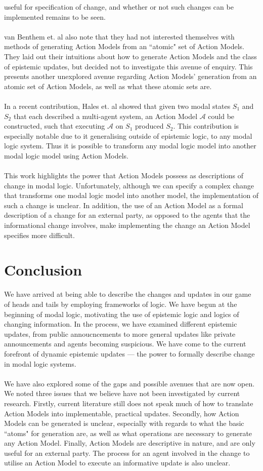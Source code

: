 \documentclass[12pt, a4paper, twoside]{article}
\begin{document}
useful for specification of change, and whether or not such changes can be
implemented remains to be seen.\\
\\
van Benthem et. al also note that they had not interested themselves with methods of
generating Action Models from an ``atomic" set of Action Models.
They laid out their intuitions about how to generate Action Models and the class
of epistemic updates, but decided not to investigate this avenue of enquiry.
This presents another unexplored avenue regarding Action Models' generation from
an atomic set of Action Models, as well as what these atomic sets are.\\
\\
In a recent contribution, Hales et. al showed that given two modal states $S_1$
and $S_2$ that each described a multi-agent system, an Action Model $\mathcal{A}$
could be constructed, such that executing $\mathcal{A}$ on $S_1$ produced $S_2$.
This contribution is especially notable due to it generalising outside of
epistemic logic, to any modal logic system.
Thus it is possible to transform any modal logic model into another modal logic
model using Action Models.\\
\\
This work highlights the power that Action Models possess as descriptions of
change in modal logic.
Unfortunately, although we can specify a complex change that transforms one modal
logic model into another model, the implementation of such a change is unclear.
In addition, the use of an Action Model as a formal description of a change for
an external party, as opposed to the agents that the informational change
involves, make implementing the change an Action Model specifies more
difficult.

\section{Conclusion} \label{conc}
We have arrived at being able to describe the changes and updates in our game of
heads and tails by employing frameworks of logic.
We have begun at the beginning of modal logic, motivating the use of epistemic
logic and logics of changing information.
In the process, we have examined different epistemic updates, from public
annoucncements to more general updates like private announcements and agents
becoming suspicious.
We have come to the current forefront of dynamic epistemic updates --- the
power to formally describe change in modal logic systems.\\
\\
We have also explored some of the gaps and possible avenues that are now open.
We noted three issues that we believe have not been investigated by current
research.
Firstly, current literature still does not speak much of how to translate Action Models
into implementable, practical updates.
Secondly, how Action Models can be generated is unclear, especially with regards to what
the basic ``atoms" for generation are, as well as what operations are necessary
to generate any Action Model.
Finally, Action Models are descriptive in nature, and are only useful for an
external party.
The process for an agent involved in the change to utilise an Action Model to
execute an informative update is also unclear.
\end{document}

